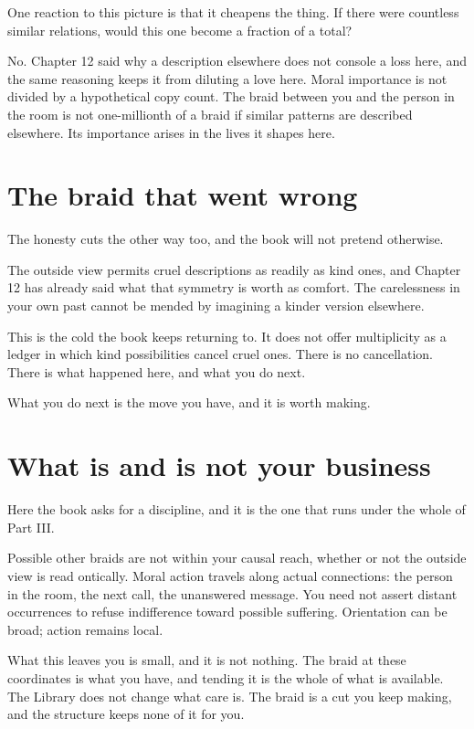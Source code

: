 One reaction to this picture is that it cheapens the thing. If there were countless similar relations, would this one become a fraction of a total?

No. Chapter 12 said why a description elsewhere does not console a loss here, and the same reasoning keeps it from diluting a love here. Moral importance is not divided by a hypothetical copy count. The braid between you and the person in the room is not one-millionth of a braid if similar patterns are described elsewhere. Its importance arises in the lives it shapes here.

\section*{The braid that went wrong}

The honesty cuts the other way too, and the book will not pretend otherwise.

The outside view permits cruel descriptions as readily as kind ones, and Chapter 12 has already said what that symmetry is worth as comfort. The carelessness in your own past cannot be mended by imagining a kinder version elsewhere.

This is the cold the book keeps returning to. It does not offer multiplicity as a ledger in which kind possibilities cancel cruel ones. There is no cancellation. There is what happened here, and what you do next.

What you do next is the move you have, and it is worth making.

\section*{What is and is not your business}

Here the book asks for a discipline, and it is the one that runs under the whole of Part III.

Possible other braids are not within your causal reach, whether or not the outside view is read ontically. Moral action travels along actual connections: the person in the room, the next call, the unanswered message. You need not assert distant occurrences to refuse indifference toward possible suffering. Orientation can be broad; action remains local.

What this leaves you is small, and it is not nothing. The braid at these coordinates is what you have, and tending it is the whole of what is available. The Library does not change what care is. The braid is a cut you keep making, and the structure keeps none of it for you.

